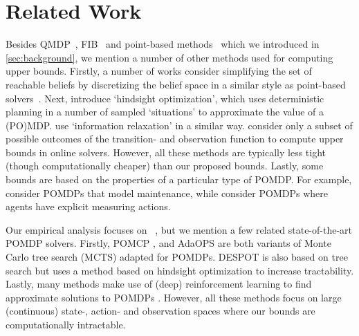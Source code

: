 \section{Related Work}
Besides QMDP~\cite{DBLP:conf/icml/LittmanCK95}, FIB~\cite{DBLP:journals/jair/Hauskrecht00} and point-based methods~\cite{DBLP:journals/ior/Lovejoy91,DBLP:conf/ijcai/ZhouH01,DBLP:conf/icml/Bonet02,DBLP:conf/ijcai/PineauGT03,DBLP:conf/uai/SmithS04,DBLP:conf/uai/SmithS05} which we introduced in \cref{sec:background}, we mention a number of other methods used for computing upper bounds.
Firstly, a number of works consider simplifying the set of reachable beliefs by discretizing the belief space in a similar style as point-based solvers~\cite{DBLP:conf/tacas/BorkKQ22, DBLP:journals/corr/abs-2104-07276, DBLP:conf/iros/WrayZ17, DBLP:journals/rts/Norman0Z17,DBLP:conf/atva/BorkJKQ20}.
Next, \citet{DBLP:conf/aaai/YoonFGK08} introduce `hindsight optimization', which uses deterministic planning in a number of sampled `situations' to approximate the value of a (PO)MDP.
\citet{DBLP:journals/tac/HaughL20} use `information relaxation' in a similar way.
\citet{DBLP:conf/nips/BarenboimI23} consider only a subset of possible outcomes of the transition- and observation function to compute upper bounds in online solvers.
However, all these methods are typically less tight (though computationally cheaper) than our proposed bounds.
Lastly, some bounds are based on the properties of a particular type of POMDP.
For example, \citet{DBLP:journals/cor/Sinuany-SternDB97} consider POMDPs that model maintenance, while \citet{DBLP:conf/aips/KraleS023} consider POMDPs where agents have explicit measuring actions.

Our empirical analysis focuses on \SARSOP~\cite{DBLP:conf/rss/KurniawatiHL08}, but we mention a few related state-of-the-art POMDP solvers.
Firstly, POMCP \cite{DBLP:conf/nips/SilverV10}, and AdaOPS \cite{DBLP:conf/nips/WuYZYLLH21} are both variants of Monte Carlo tree search (MCTS) adapted for POMDPs.
DESPOT \cite{DBLP:journals/jair/YeSHL17} is also based on tree search but uses a method based on hindsight optimization to increase tractability.
Lastly, many methods make use of (deep) reinforcement learning to find approximate solutions to POMDPs \cite{DBLP:conf/aaaifs/HausknechtS15,DBLP:conf/nips/LeeNAL20,DBLP:conf/iclr/HanDT20}.
However, all these methods focus on large (continuous) state-, action- and observation spaces where our bounds are computationally intractable.

